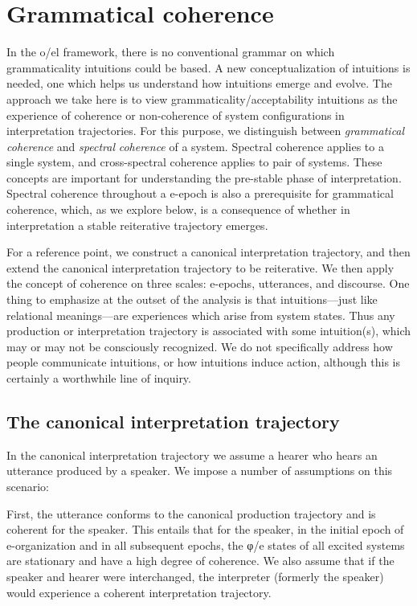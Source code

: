 \section{Grammatical coherence}

In the o/el framework, there is no conventional grammar on which grammaticality intuitions could be based. A new conceptualization of intuitions is needed, one which helps us understand how intuitions emerge and evolve. The approach we take here is to view grammaticality/acceptability intuitions as the experience of coherence or non-coherence of system configurations in interpretation trajectories. For this purpose, we distinguish between \textit{grammatical} \textit{coherence} and \textit{spectral} \textit{coherence} of a system. Spectral coherence applies to a single system, and cross-spectral coherence applies to pair of systems. These concepts are important for understanding the pre-stable phase of interpretation. Spectral coherence throughout a e-epoch is also a prerequisite for grammatical coherence, which, as we explore below, is a consequence of whether in interpretation a stable reiterative trajectory emerges.

For a reference point, we construct a canonical interpretation trajectory, and then extend the canonical interpretation trajectory to be reiterative. We then apply the concept of coherence on three scales: e-epochs, utterances, and discourse. One thing to emphasize at the outset of the analysis is that intuitions—just like relational meanings—are experiences which arise from system states. Thus any production or interpretation trajectory is associated with some intuition(s), which may or may not be consciously recognized. We do not specifically address how people communicate intuitions, or how intuitions induce action, although this is certainly a worthwhile line of inquiry.

\subsection{The canonical interpretation trajectory}

In the canonical interpretation trajectory we assume a hearer who hears an utterance produced by a speaker. We impose a number of assumptions on this scenario:

First, the utterance conforms to the canonical production trajectory and is coherent for the speaker. This entails that for the speaker, in the initial epoch of e-organization and in all subsequent epochs, the φ/e states of all excited systems are stationary and have a high degree of coherence. We also assume that if the speaker and hearer were interchanged, the interpreter (formerly the speaker) would experience a coherent interpretation trajectory. 

